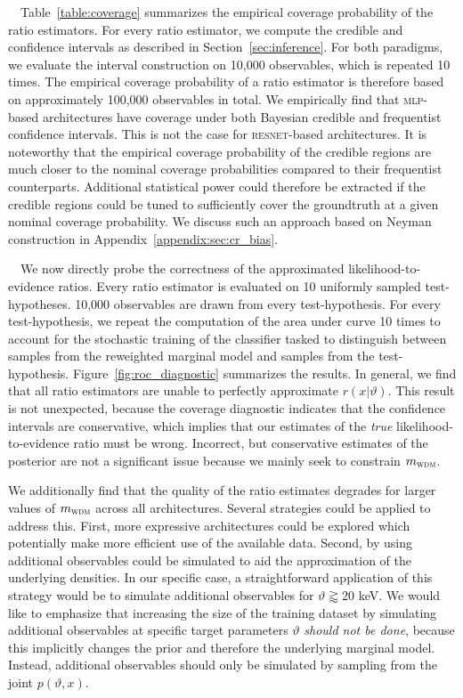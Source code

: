 \documentclass[fleqn,usenatbib]{mnras}
\begin{document}
\medskip

~~Table~\ref{table:coverage}
summarizes the empirical coverage probability
of the ratio estimators. For every ratio estimator,
we compute the credible and confidence intervals as described in Section~\ref{sec:inference}.
For both paradigms, we evaluate the interval construction on 10,000 observables,
which is repeated 10 times.
The empirical coverage probability of a ratio estimator is therefore based
on approximately 100,000 observables in total.
We empirically find that \textsc{mlp}-based architectures have
coverage under both Bayesian credible and frequentist
confidence intervals. This is not the case for \textsc{resnet}-based
architectures.
It is noteworthy that the empirical coverage probability
of the credible regions are much closer to the nominal coverage
probabilities
compared to their frequentist counterparts.
Additional statistical power could therefore be extracted if
the credible regions could be tuned to
sufficiently cover the groundtruth at a given nominal coverage probability.
We discuss such an approach based on Neyman construction in Appendix~\ref{appendix:sec:cr_bias}.

\medskip

~~We now directly probe
the correctness of the approximated likelihood-to-evidence ratios.
Every ratio estimator is evaluated on 10 uniformly sampled test-hypotheses.
10,000 observables are drawn from every test-hypothesis. For
every test-hypothesis, we repeat the computation of the area
under curve 10 times to account for the stochastic
training of the classifier tasked to distinguish
between samples from the reweighted marginal model
and samples from the test-hypothesis.
Figure~\ref{fig:roc_diagnostic} summarizes the results.
In general, we find that all ratio estimators are unable to perfectly approximate
$r(x\vert\vartheta)$.
This result is not unexpected, because the coverage diagnostic indicates
that the confidence intervals are conservative, which implies that our
estimates of the \emph{true} likelihood-to-evidence ratio must be wrong.
Incorrect, but conservative estimates of the posterior are not a significant issue
because we mainly seek to constrain $m_\textsc{wdm}$.

\medskip

We additionally find that the quality of the ratio estimates degrades
for larger values of $m_\textsc{wdm}$ across all architectures.
Several strategies could be applied to address this. First, 
more expressive architectures could be explored
which potentially make more efficient use of the available data. 
Second, by using additional observables
could be simulated
to aid the approximation of the underlying densities.
In our specific case, a straightforward application of this strategy would be to simulate additional
observables for $\vartheta \gtrapprox 20$ keV. We would like to emphasize
that increasing the size of the training dataset by
simulating additional observables at specific target parameters $\vartheta$ \emph{should not be done},
because this implicitly changes the prior and therefore the underlying marginal model.
Instead, additional observables should only be simulated by sampling from the joint $p(\vartheta, x)$.
\end{document}
